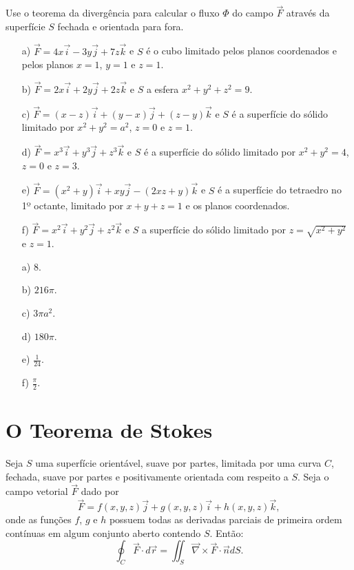 \begin{exer}
 Use o teorema da divergência para calcular o fluxo $\Phi$ do campo $\vec{F}$ através da superfície $S$ fechada e orientada para fora.
 \begin{itemize}
  \item[a)] $\vec{F}=4x\vec{i}-3y\vec{j}+7z\vec{k}$ e $S$ é o cubo limitado pelos planos coordenados e pelos planos $x=1$, $y=1$ e $z=1$.
  \item[b)] $\vec{F}=2x\vec{i}+2y\vec{j}+2z\vec{k}$ e $S$ a esfera $x^2+y^2+z^2=9$.
  \item[c)] $\vec{F}=(x-z)\vec{i}+(y-x)\vec{j}+(z-y)\vec{k}$ e $S$ é a superfície do sólido limitado por $x^2+y^2=a^2$, $z=0$ e $z=1$.
  \item[d)] $\vec{F}=x^3\vec{i}+y^3\vec{j}+z^3\vec{k}$ e $S$ é a superfície do sólido limitado por $x^2+y^2=4$, $z=0$ e $z=3$.
  \item[e)] $\vec{F}=(x^2+y)\vec{i}+xy\vec{j}-(2xz+y)\vec{k}$ e $S$ é a superfície do tetraedro no 1º octante, limitado por $x+y+z=1$ e os planos coordenados.
  \item[f)] $\vec{F}=x^2\vec{i}+y^2\vec{j}+z^2\vec{k}$ e $S$ a superfície do sólido limitado por $z=\sqrt{x^2+y^2}$ e $z=1$.
 \end{itemize}
\end{exer}
\begin{resp}
\begin{itemize}
 \item[a)] $8$.
 \item[b)] $216\pi$. 
 \item[c)] $3\pi a^2$. 
 \item[d)] $180\pi$.
 \item[e)] $\frac{1}{24}$. 
 \item[f)] $\frac{\pi}{2}$. 
\end{itemize}
\end{resp}



\section{O Teorema de Stokes}

\begin{teo}
Seja $S$ uma superfície orientável, suave por partes, limitada por uma curva $C$, fechada, suave por partes e positivamente orientada com respeito a $S$. Seja o campo vetorial $\vec{F}$ dado por
$$
\vec{F}=f(x,y,z)\vec{j}+g(x,y,z)\vec{i}+h(x,y,z)\vec{k},
$$
onde as funções $f$, $g$ e $h$ possuem todas as derivadas parciais de primeira ordem contínuas em algum conjunto aberto contendo $S$. Então:
$$
\oint_C \vec{F}\cdot d \vec{r}=\iint_S \vec{\nabla}\times \vec{F}\cdot \vec{n} dS.
$$
\end{teo}

